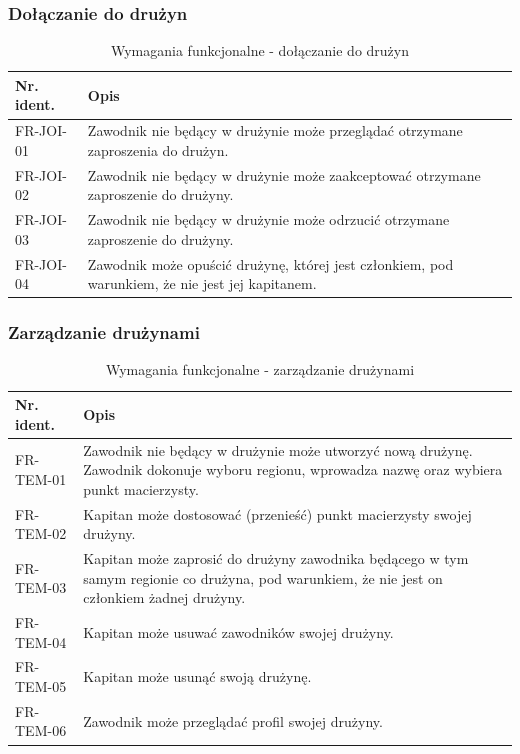 \subsubsection{Dołączanie do drużyn}

\begin{table}[H]
\centering\small
\caption{Wymagania funkcjonalne - dołączanie do drużyn}
\label{tab:szablon}
\begin{tabularx}{\linewidth}{|p{.2\linewidth}|X|}\hline
Nr. ident. & Opis \\ \hline\hline

FR-JOI-01 & Zawodnik nie będący w drużynie może przeglądać otrzymane zaproszenia do drużyn.\\ \hline

FR-JOI-02 & Zawodnik nie będący w drużynie może zaakceptować otrzymane zaproszenie do drużyny.\\ \hline

FR-JOI-03 & Zawodnik nie będący w drużynie może odrzucić otrzymane zaproszenie do drużyny.\\ \hline

FR-JOI-04 & Zawodnik może opuścić drużynę, której jest członkiem, pod warunkiem, że nie jest jej kapitanem.\\ \hline

\end{tabularx}
\end{table}


\subsubsection{Zarządzanie drużynami}

\begin{table}[H]
\centering\small
\caption{Wymagania funkcjonalne - zarządzanie drużynami}
\label{tab:szablon}
\begin{tabularx}{\linewidth}{|p{.2\linewidth}|X|}\hline
Nr. ident. & Opis \\ \hline\hline

FR-TEM-01 & Zawodnik nie będący w drużynie może utworzyć nową drużynę. Zawodnik dokonuje wyboru regionu, wprowadza nazwę oraz wybiera punkt macierzysty.\\ \hline

FR-TEM-02 & Kapitan może dostosować (przenieść) punkt macierzysty swojej drużyny.\\ \hline

FR-TEM-03 & Kapitan może zaprosić do drużyny zawodnika będącego w tym samym regionie co drużyna, pod warunkiem, że nie jest on członkiem żadnej drużyny.\\ \hline

FR-TEM-04 & Kapitan może usuwać zawodników swojej drużyny.\\ \hline

FR-TEM-05 & Kapitan może usunąć swoją drużynę.\\ \hline

FR-TEM-06 & Zawodnik może przeglądać profil swojej drużyny.\\ \hline

\end{tabularx}
\end{table}

